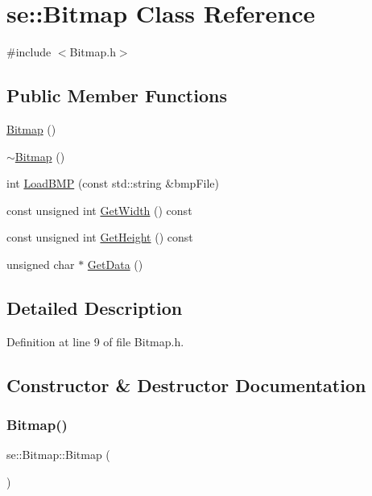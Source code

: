 \hypertarget{classse_1_1_bitmap}{}\section{se\+:\+:Bitmap Class Reference}
\label{classse_1_1_bitmap}


{\ttfamily \#include $<$Bitmap.\+h$>$}

\subsection*{Public Member Functions}
\begin{DoxyCompactItemize}
\item 
\mbox{\hyperlink{classse_1_1_bitmap_a7b43662ae9e5584ee8e3cef244ca32f7}{Bitmap}} ()
\item 
\mbox{\hyperlink{classse_1_1_bitmap_aa098fcae7998e75240e46594fe84996e}{$\sim$\+Bitmap}} ()
\item 
int \mbox{\hyperlink{classse_1_1_bitmap_a76c7fbaf5d2049af44abf83fe40a854d}{Load\+B\+MP}} (const std\+::string \&bmp\+File)
\item 
const unsigned int \mbox{\hyperlink{classse_1_1_bitmap_adff193db6b52af590cad8f7200a83b6c}{Get\+Width}} () const
\item 
const unsigned int \mbox{\hyperlink{classse_1_1_bitmap_a24d34941103efc40b746d16bc4650970}{Get\+Height}} () const
\item 
unsigned char $\ast$ \mbox{\hyperlink{classse_1_1_bitmap_a2467e494eccacc94756c3f02b0d0cc5e}{Get\+Data}} ()
\end{DoxyCompactItemize}


\subsection{Detailed Description}


Definition at line 9 of file Bitmap.\+h.



\subsection{Constructor \& Destructor Documentation}
\mbox{\label{classse_1_1_bitmap_a7b43662ae9e5584ee8e3cef244ca32f7}} 
\subsubsection{\texorpdfstring{Bitmap()}{Bitmap()}}
{\footnotesize\ttfamily se\+::\+Bitmap\+::\+Bitmap (\begin{DoxyParamCaption}{ }\end{DoxyParamCaption})}

